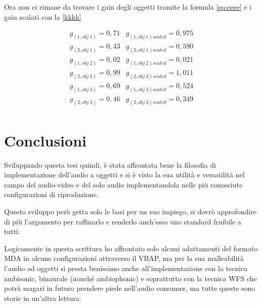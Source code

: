 \documentclass[12pt,a4paper]{report}
\begin{document}
Ora non ci rimane da trovare i gain degli oggetti tramite la formula \ref{eq:eeee} e i gain scalati con la \ref{kkkk}

\begin{equation}
\begin{matrix}
g_{(1,obj\ 1)} = 0,71 & g_{(1,obj\ 1)scaled} = 0,975\\
g_{(2,obj\ 1)} = 0,43 & g_{(2,obj\ 1)scaled} = 0,590\\
g_{(1,obj\ 2)} = 0,02 & g_{(1,obj\ 2)scaled} = 0,021\\
g_{(2,obj\ 2)} = 0,99 & g_{(2,obj\ 2)scaled} = 1,011\\
g_{(1,obj\ 3)} = 0,69 & g_{(1,obj\ 3)scaled} = 0,524\\
g_{(2,obj\ 3)} = 0,46 & g_{(2,obj\ 3)scaled} = 0,349\\
\end{matrix}
\label{gscalatiesempio3}
\end{equation}










\chapter*{Conclusioni}

Sviluppando questa tesi quindi, è stata affrontata bene la filosofia di implementazione dell'audio a oggetti e si è visto la sua utilità e versatilità nel campo del audio-video e del solo audio implementandola nelle più conosciute configurazioni di riproduzione.

Questo sviluppo però getta solo le basi per un suo impiego, si dovrò approfondire di più l'argomento per raffinarlo e renderlo anch'esso uno standard fruibile a tutti.

Logicamente in questa scrittura ho affrontato solo alcuni adattamenti del formato MDA in alcune configurazioni attraverso il VBAP, ma per la sua malleabilità l'audio ad oggetti si presta benissimo anche all'implementazione con la tecnica ambisonic, binaurale (nonché ambiophonic) e soprattutto con la tecnica WFS che potrà magari in futuro prendere piede nell'audio consumer, ma tutte queste sono storie in un'altra lettura.



\end{document}
